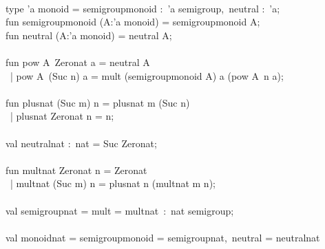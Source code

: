 \begin{isabellebody}
\begin{isamarkuptext}
\hspace*{0pt}\\
\hspace*{0pt}type 'a monoid = {}semigroup{}monoid :~'a semigroup,~neutral :~'a{};\\
\hspace*{0pt}fun semigroup{}monoid (A{}:'a monoid) = {}semigroup{}monoid A{};\\
\hspace*{0pt}fun neutral (A{}:'a monoid) = {}neutral A{};\\
\hspace*{0pt}\\
\hspace*{0pt}fun pow A{}~Zero{}nat a = neutral A{}\\
\hspace*{0pt} ~| pow A{}~(Suc n) a = mult (semigroup{}monoid A{}) a (pow A{}~n a);\\
\hspace*{0pt}\\
\hspace*{0pt}fun plus{}nat (Suc m) n = plus{}nat m (Suc n)\\
\hspace*{0pt} ~| plus{}nat Zero{}nat n = n;\\
\hspace*{0pt}\\
\hspace*{0pt}val neutral{}nat :~nat = Suc Zero{}nat;\\
\hspace*{0pt}\\
\hspace*{0pt}fun mult{}nat Zero{}nat n = Zero{}nat\\
\hspace*{0pt} ~| mult{}nat (Suc m) n = plus{}nat n (mult{}nat m n);\\
\hspace*{0pt}\\
\hspace*{0pt}val semigroup{}nat = {}mult = mult{}nat{}~:~nat semigroup;\\
\hspace*{0pt}\\
\hspace*{0pt}val monoid{}nat = {}semigroup{}monoid = semigroup{}nat,~neutral = neutral{}nat{}\\

\end{isamarkuptext}
\end{isabellebody}
